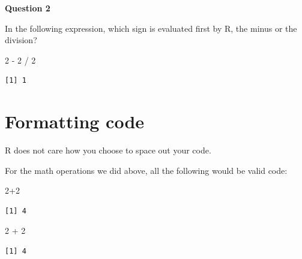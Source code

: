 \documentclass[
  letterpaper,
  DIV=11,
  numbers=noendperiod]{scrreprt}
\newenvironment{Shaded}{\begin{snugshade}}{\end{snugshade}}
\newcommand{\DecValTok}[1]{\textcolor[rgb]{0.68,0.00,0.00}{#1}}
\newcommand{\SpecialCharTok}[1]{\textcolor[rgb]{0.37,0.37,0.37}{#1}}
\begin{document}
\begin{tcolorbox}[enhanced jigsaw, title=\textcolor{quarto-callout-tip-color}{\faLightbulb}\hspace{0.5em}{Practice}, colbacktitle=quarto-callout-tip-color!10!white, leftrule=.75mm, arc=.35mm, opacityback=0, bottomrule=.15mm, rightrule=.15mm, toptitle=1mm, breakable, toprule=.15mm, colback=white, coltitle=black, colframe=quarto-callout-tip-color-frame, bottomtitle=1mm, titlerule=0mm, left=2mm, opacitybacktitle=0.6]

\textbf{Question 2}

In the following expression, which sign is evaluated first by R, the
minus or the division?

\begin{Shaded}
\begin{Highlighting}[]
\DecValTok{2} \SpecialCharTok{{-}} \DecValTok{2} \SpecialCharTok{/} \DecValTok{2}
\end{Highlighting}
\end{Shaded}

\begin{verbatim}
[1] 1
\end{verbatim}

\end{tcolorbox}

\section{Formatting code}\label{formatting-code}

R does not care how you choose to space out your code.

For the math operations we did above, all the following would be valid
code:

\begin{Shaded}
\begin{Highlighting}[]
\DecValTok{2}\SpecialCharTok{+}\DecValTok{2}
\end{Highlighting}
\end{Shaded}

\begin{verbatim}
[1] 4
\end{verbatim}

\begin{Shaded}
\begin{Highlighting}[]
\DecValTok{2} \SpecialCharTok{+} \DecValTok{2}
\end{Highlighting}
\end{Shaded}

\begin{verbatim}
[1] 4
\end{verbatim}
\end{document}
